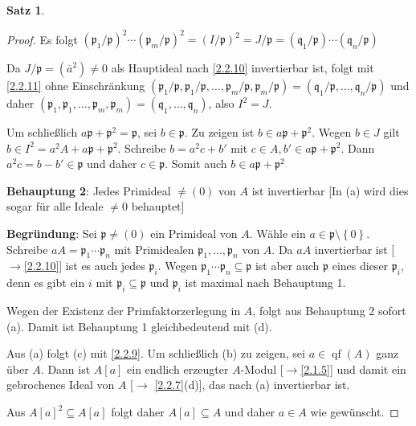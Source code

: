 \documentclass[
twoside=semi,
fontsize=12,
DIV=12, 
cleardoublepage=current,
leqno,
headings=optiontoheadandtoc, 
toc=idx
]{scrbook}
\newcommand{\set}[1]{\left\{ #1 \right\}}
\DeclareMathOperator{\qf}{qf}
\theoremstyle{definition}
\newtheorem{satz}[definition]{Satz}
\begin{document}
\begin{satz}
\begin{proof}
{ 			Es folgt $(\mathfrak{p}_1/\mathfrak{p})^2 \cdots (\mathfrak{p}_m/\mathfrak{p})^2 = (I/\mathfrak{p})^2 = J/\mathfrak{p} = (\mathfrak{q}_1/\mathfrak{p})\cdots (\mathfrak{q}_n/\mathfrak{p})$
 			
 			Da $J/\mathfrak{p} = (\overline{a}^2) \neq 0$ als Hauptideal nach \ref{2.2.10} invertierbar ist, folgt mit \ref{2.2.11} ohne Einschr\"ankung $(\mathfrak{p}_1/\mathfrak{p}, \mathfrak{p}_1/\mathfrak{p}, \dots, \mathfrak{p}_m/\mathfrak{p}, \mathfrak{p}_m/\mathfrak{p}) = (\mathfrak{q}_1/\mathfrak{p},\dots, \mathfrak{q}_n/\mathfrak{p})$  und daher \linebreak
 			$(\mathfrak{p}_1,\mathfrak{p}_1,\dots,\mathfrak{p}_m,\mathfrak{p}_m) = (\mathfrak{q}_1,\dots,\mathfrak{q}_n)$, also $I^2 = J$.
 			
 			Um schlie\ss lich $a\mathfrak{p} + \mathfrak{p}^2 = \mathfrak{p}$, sei $b \in \mathfrak{p}$. Zu zeigen ist $b \in a\mathfrak{p} + \mathfrak{p}^2$. Wegen $b \in J$ gilt $b \in I^2 = a^2A + a\mathfrak{p}+ \mathfrak{p}^2$. Schreibe $b = a^2c + b'$ mit $c \in A, b' \in a\mathfrak{p}+\mathfrak{p}^2$. Dann $a^2c = b - b' \in \mathfrak{p}$ und daher $c \in \mathfrak{p}$. Somit auch $b \in a \mathfrak{p} + \mathfrak{p}^2$
 			
 			\medskip\noindent 
 			\textbf{Behauptung 2}: Jedes Primideal $\neq (0)$ von $A$ ist invertierbar [In (a) wird dies sogar f\"ur alle Ideale $\neq 0$ behauptet]
 			
 			\smallskip\noindent 
 			\textbf{Begr\"undung}: Sei $\mathfrak{p} \neq (0)$ ein Primideal von $A$. W\"ahle ein $a \in \mathfrak{p}\setminus \set{0}$. Schreibe $aA = \mathfrak{p}_1 \cdots \mathfrak{p}_n$ mit Primidealen $\mathfrak{p}_1,\dots, \mathfrak{p}_n$ von $A$. Da $aA$ invertierbar ist [$\to$\ref{2.2.10}] ist es auch jedes $\mathfrak{p}_i$. Wegen $\mathfrak{p}_1\cdots \mathfrak{p}_n \subseteq \mathfrak{p}$ ist aber auch $\mathfrak{p}$ eines dieser $\mathfrak{p}_i$, denn es gibt ein $i$ mit $\mathfrak{p}_i \subseteq \mathfrak{p}$ und $\mathfrak{p}_i$ ist maximal nach Behauptung 1.
 			}
 			
 			
 			\medskip\noindent Wegen der Existenz der Primfaktorzerlegung in $A$, folgt aus Behauptung 2 sofort (a). Damit ist Behauptung 1 gleichbedeutend mit (d). 
 			
 			Aus (a) folgt (c) mit \ref{2.2.9}. Um schlie\ss lich (b) zu zeigen, sei $a \in \qf(A)$ ganz \"uber $A$. Dann ist $A[a]$ ein endlich erzeugter $A$-Modul [$\to$\ref{2.1.5}] und damit ein gebrochenes Ideal von $A$ [$\to$ \ref{2.2.7}(d)], das nach (a) invertierbar ist. 
 			
 			Aus $A[a]^2 \subseteq A[a]$ folgt daher $A[a] \subseteq A$ und daher $a \in A$ wie gew\"unscht.
   		\end{proof}
   	 \end{satz}
   	\newpage
   		
\end{document}
